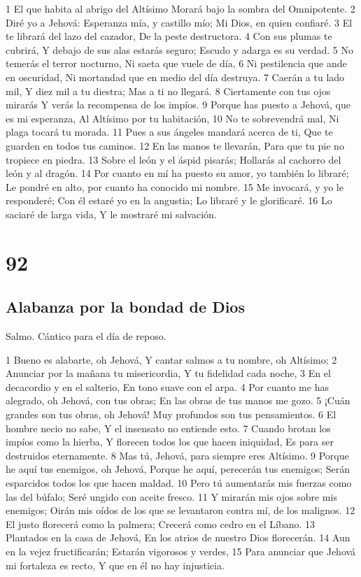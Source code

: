 1 El que habita al abrigo del Altísimo
Morará bajo la sombra del Omnipotente.
2 Diré yo a Jehová: Esperanza mía, y castillo mío;
Mi Dios, en quien confiaré.
3 El te librará del lazo del cazador,
De la peste destructora.
4 Con sus plumas te cubrirá,
Y debajo de sus alas estarás seguro;
Escudo y adarga es su verdad.
5 No temerás el terror nocturno,
Ni saeta que vuele de día,
6 Ni pestilencia que ande en oscuridad,
Ni mortandad que en medio del día destruya.
7 Caerán a tu lado mil,
Y diez mil a tu diestra;
Mas a ti no llegará.
8 Ciertamente con tus ojos mirarás
Y verás la recompensa de los impíos.
9 Porque has puesto a Jehová, que es mi esperanza,
Al Altísimo por tu habitación,
10 No te sobrevendrá mal,
Ni plaga tocará tu morada.
11 Pues a sus ángeles mandará acerca de ti,
Que te guarden en todos tus caminos.
12 En las manos te llevarán,
Para que tu pie no tropiece en piedra.
13 Sobre el león y el áspid pisarás;
Hollarás al cachorro del león y al dragón.
14 Por cuanto en mí ha puesto su amor, yo también lo libraré;
Le pondré en alto, por cuanto ha conocido mi nombre.
15 Me invocará, y yo le responderé;
Con él estaré yo en la angustia;
Lo libraré y le glorificaré.
16 Lo saciaré de larga vida,
Y le mostraré mi salvación.

\chapter{92}

\section*{Alabanza por la bondad de Dios}

Salmo. Cántico para el día de reposo.

1 Bueno es alabarte, oh Jehová,
Y cantar salmos a tu nombre, oh Altísimo;
2 Anunciar por la mañana tu misericordia,
Y tu fidelidad cada noche,
3 En el decacordio y en el salterio,
En tono suave con el arpa.
4 Por cuanto me has alegrado, oh Jehová, con tus obras;
En las obras de tus manos me gozo.
5 ¡Cuán grandes son tus obras, oh Jehová!
Muy profundos son tus pensamientos.
6 El hombre necio no sabe,
Y el insensato no entiende esto.
7 Cuando brotan los impíos como la hierba,
Y florecen todos los que hacen iniquidad,
Es para ser destruidos eternamente.
8 Mas tú, Jehová, para siempre eres Altísimo.
9 Porque he aquí tus enemigos, oh Jehová,
Porque he aquí, perecerán tus enemigos;
Serán esparcidos todos los que hacen maldad.
10 Pero tú aumentarás mis fuerzas como las del búfalo;
Seré ungido con aceite fresco.
11 Y mirarán mis ojos sobre mis enemigos;
Oirán mis oídos de los que se levantaron contra mí, de los malignos.
12 El justo florecerá como la palmera;
Crecerá como cedro en el Líbano.
13 Plantados en la casa de Jehová,
En los atrios de nuestro Dios florecerán.
14 Aun en la vejez fructificarán;
Estarán vigorosos y verdes,
15 Para anunciar que Jehová mi fortaleza es recto,
Y que en él no hay injusticia.

